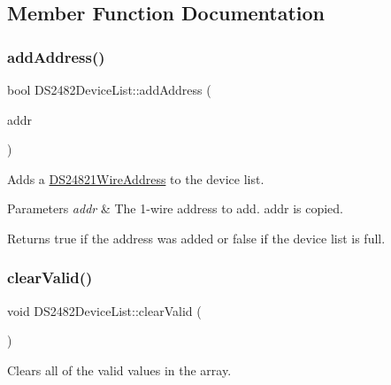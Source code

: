 \subsection{Member Function Documentation}
\mbox{\label{class_d_s2482_device_list_a86c4f24502b9cb73376a6b102bb27f52}} 
\subsubsection{\texorpdfstring{add\+Address()}{addAddress()}}
{\footnotesize\ttfamily bool D\+S2482\+Device\+List\+::add\+Address (\begin{DoxyParamCaption}\item[{const \mbox{\hyperlink{class_d_s24821_wire_address}{D\+S24821\+Wire\+Address}} \&}]{addr }\end{DoxyParamCaption})}



Adds a \mbox{\hyperlink{class_d_s24821_wire_address}{D\+S24821\+Wire\+Address}} to the device list. 


\begin{DoxyParams}{Parameters}
{\em addr} & The 1-\/wire address to add. addr is copied.\\
\hline
\end{DoxyParams}
\begin{DoxyReturn}{Returns}
true if the address was added or false if the device list is full. 
\end{DoxyReturn}
\mbox{\label{class_d_s2482_device_list_a2775548aa0394724d64a73f48b93f938}} 
\subsubsection{\texorpdfstring{clear\+Valid()}{clearValid()}}
{\footnotesize\ttfamily void D\+S2482\+Device\+List\+::clear\+Valid (\begin{DoxyParamCaption}{ }\end{DoxyParamCaption})}



Clears all of the valid values in the array. 

